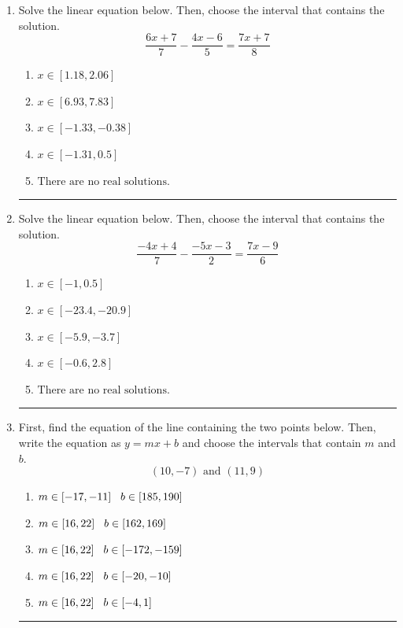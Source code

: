 \documentclass[14pt]{extbook}
\newcommand{\litem}[1]{\item#1\hspace*{-1cm}\rule{\textwidth}{0.4pt}}
\begin{document}
\begin{enumerate}
{\begin{enumerate}[label=\Alph*.]
\end{enumerate} }
\litem{
Solve the linear equation below. Then, choose the interval that contains the solution.\[ \frac{6x + 7}{7} - \frac{4x -6}{5} = \frac{7x + 7}{8} \]\begin{enumerate}[label=\Alph*.]
\item \( x \in [1.18, 2.06] \)
\item \( x \in [6.93, 7.83] \)
\item \( x \in [-1.33, -0.38] \)
\item \( x \in [-1.31, 0.5] \)
\item \( \text{There are no real solutions.} \)

\end{enumerate} }
\litem{
Solve the linear equation below. Then, choose the interval that contains the solution.\[ \frac{-4x + 4}{7} - \frac{-5x -3}{2} = \frac{7x -9}{6} \]\begin{enumerate}[label=\Alph*.]
\item \( x \in [-1, 0.5] \)
\item \( x \in [-23.4, -20.9] \)
\item \( x \in [-5.9, -3.7] \)
\item \( x \in [-0.6, 2.8] \)
\item \( \text{There are no real solutions.} \)

\end{enumerate} }
\litem{
First, find the equation of the line containing the two points below. Then, write the equation as $ y=mx+b $ and choose the intervals that contain $m$ and $b$.\[ (10, -7) \text{ and } (11, 9) \]\begin{enumerate}[label=\Alph*.]
\item \( m \in [-17, -11] \hspace*{3mm} b \in [185, 190] \)
\item \( m \in [16, 22] \hspace*{3mm} b \in [162, 169] \)
\item \( m \in [16, 22] \hspace*{3mm} b \in [-172, -159] \)
\item \( m \in [16, 22] \hspace*{3mm} b \in [-20, -10] \)
\item \( m \in [16, 22] \hspace*{3mm} b \in [-4, 1] \)

\end{enumerate} }
\end{enumerate}
\end{document}
